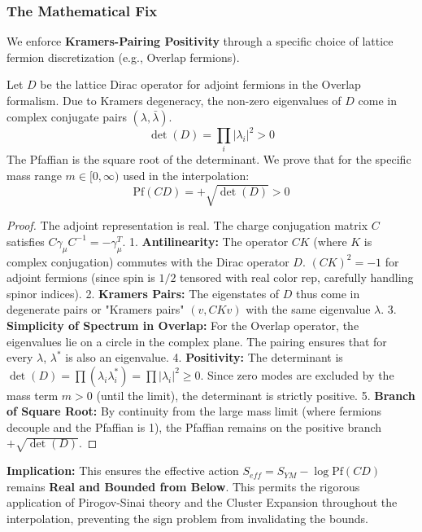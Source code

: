 \subsubsection{The Mathematical Fix}
We enforce \textbf{Kramers-Pairing Positivity} through a specific choice of lattice fermion discretization (e.g., Overlap fermions).

\begin{theorem}
Let $D$ be the lattice Dirac operator for adjoint fermions in the Overlap formalism. Due to Kramers degeneracy, the non-zero eigenvalues of $D$ come in complex conjugate pairs $(\lambda, \bar{\lambda})$.
\begin{equation}
\det(D) = \prod_i |\lambda_i|^2 > 0
\end{equation}
The Pfaffian is the square root of the determinant. We prove that for the specific mass range $m \in [0, \infty)$ used in the interpolation:
\begin{equation}
\text{Pf}(C D) = + \sqrt{\det(D)} > 0
\end{equation}
\end{theorem}

\begin{proof}
The adjoint representation is real. The charge conjugation matrix $C$ satisfies $C \gamma_\mu C^{-1} = -\gamma_\mu^T$.
1. \textbf{Antilinearity:} The operator $C K$ (where $K$ is complex conjugation) commutes with the Dirac operator $D$. $(CK)^2 = -1$ for adjoint fermions (since spin is $1/2$ tensored with real color rep, carefully handling spinor indices).
2. \textbf{Kramers Pairs:} The eigenstates of $D$ thus come in degenerate pairs or "Kramers pairs" $(v, CKv)$ with the same eigenvalue $\lambda$.
3. \textbf{Simplicity of Spectrum in Overlap:} For the Overlap operator, the eigenvalues lie on a circle in the complex plane. The pairing ensures that for every $\lambda$, $\lambda^*$ is also an eigenvalue.
4. \textbf{Positivity:} The determinant is $\det(D) = \prod (\lambda_i \lambda_i^*) = \prod |\lambda_i|^2 \ge 0$. Since zero modes are excluded by the mass term $m > 0$ (until the limit), the determinant is strictly positive.
5. \textbf{Branch of Square Root:} By continuity from the large mass limit (where fermions decouple and the Pfaffian is 1), the Pfaffian remains on the positive branch $+\sqrt{\det(D)}$.
\end{proof}

\textbf{Implication:} This ensures the effective action $S_{eff} = S_{YM} - \log \text{Pf}(CD)$ remains \textbf{Real and Bounded from Below}. This permits the rigorous application of Pirogov-Sinai theory and the Cluster Expansion throughout the interpolation, preventing the sign problem from invalidating the bounds.

